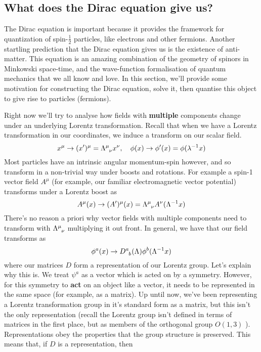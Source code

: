 \subsection{What does the Dirac equation give us?} 
The Dirac equation is important because it provides the framework for quantization of spin-$\frac{1}{ 2}$ particles, like electrons and other fermions. Another startling prediction that the Dirac equation gives us is the existence of anti-matter. This equation is an amazing combination of the geometry of spinors in Minkowski space-time, and the wave-function formalisation of quantum mechanics that we all know and love. 
In this section, we'll provide some motivation for constructing the Dirac equation, solve it, then quantise this object to give rise to particles (fermions). 

Right now we'll try to analyse how fields with \textbf{multiple}
components change under an underlying Lorentz transformation. 
Recall that when we have a Lorentz transformation in our 
coordinates, we induce a transform on our scalar field. 
\[
	x ^ \mu \to ( x ') ^ \mu = \Lambda \indices{ ^ \mu _ \nu } x  ^ \nu, \quad 
 \phi ( x) \to \phi ' ( x) = \phi ( \lambda ^{ -1 } x ) 
\] Most particles have an intrinsic angular momentum-spin however, 
and so transform in a non-trivial way 
under boosts and rotations. 
For example a spin-1 vector field $ A ^ \mu $ (for example, 
our familiar electromagnetic vector potential) transforms under a 
Lorentz boost as 
\[
	A ^ \mu ( x) \to (A ') ^ \mu ( x) = \Lambda \indices{ ^ \mu _ \nu } A ^ \nu ( \Lambda ^{ - 1 } x )  
\] There's no 
reason a priori why vector fields with 
multiple components need to transform with $ \Lambda \indices{ ^ \mu _ \nu } $
multiplying it out front. In general, we have that our field transforms 
as 
\[
	\phi ^ a ( x) \to D \indices{ ^ a _ b  } ( \Lambda ) \phi ^ b ( \Lambda ^{ - 1} x )  
\] where our matrices $ D $ form a representation of our Lorentz group. Let's 
explain why this is. We treat $ \psi ^ a $ as a vector which 
is acted on by a symmetry. However, for this symmetry to  \textbf{act} 
on an object like a vector, it needs to be represented in 
the same space (for example, as a matrix). 
Up until now, we've been representing a Lorentz transformation group
in it's standard form as a matrix, but this isn't
the only representation (recall the Lorentz group isn't 
defined in terms of matrices in the first place, but 
as members of the orthogonal group $O(1, 3 )$ ). 
Representations obey the properties that the group structure is preserved.
This means that, if $ D $ is a representation, then
